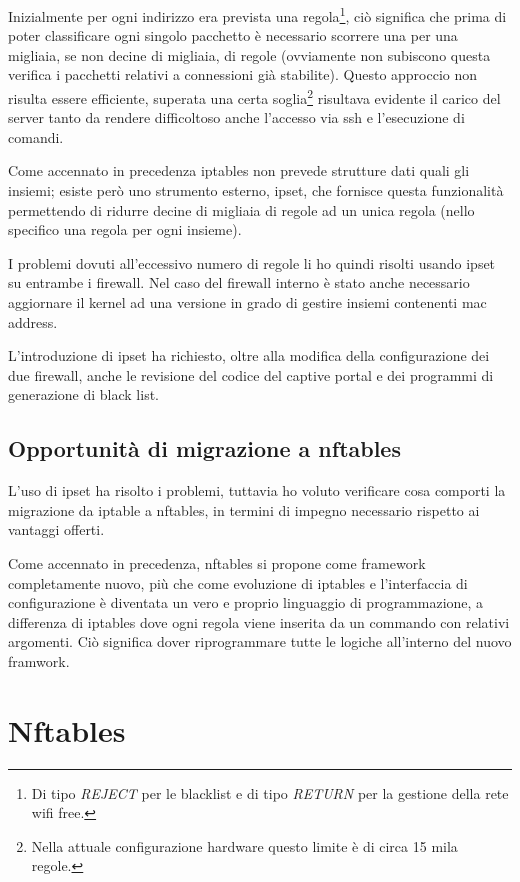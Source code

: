 Inizialmente per ogni indirizzo era prevista una regola\footnote{Di tipo {\em
REJECT} per le blacklist e di tipo {\em RETURN} per la gestione della rete wifi
free.}, ciò significa che prima di poter classificare ogni singolo pacchetto
\`e necessario scorrere una per una migliaia, se non decine di migliaia, di
regole (ovviamente non subiscono questa verifica i pacchetti relativi a
connessioni gi\`a stabilite).  Questo approccio non risulta essere efficiente,
superata una certa soglia\footnote{Nella attuale configurazione hardware
questo limite \`e di circa 15 mila regole.}
risultava evidente il carico del server tanto da rendere difficoltoso anche
l'accesso via ssh e l'esecuzione di comandi.

Come accennato in precedenza iptables non prevede strutture dati quali gli
insiemi; esiste per\`o uno strumento esterno, ipset, che fornisce questa
funzionalità permettendo di ridurre decine di migliaia di regole ad un unica
regola (nello specifico una regola per ogni insieme).

I problemi dovuti all'eccessivo numero di regole li ho quindi risolti usando
ipset su entrambe i firewall.  Nel caso del firewall interno è stato anche
necessario aggiornare il kernel ad una versione in grado di gestire insiemi
contenenti mac address.

L'introduzione di ipset ha richiesto, oltre alla modifica della configurazione
dei due firewall, anche le revisione del codice del captive portal e dei
programmi di generazione di black list.

\section{Opportunità di migrazione a nftables}

L'uso di ipset ha risolto i problemi, tuttavia ho voluto verificare cosa
comporti la migrazione da iptable a nftables, in termini di impegno necessario
rispetto ai vantaggi offerti.

Come accennato in precedenza, nftables si propone come framework completamente
nuovo, più che come evoluzione di iptables  e l'interfaccia di configurazione
è diventata un vero e proprio linguaggio di programmazione, a differenza di
iptables dove ogni regola viene inserita da un commando con relativi
argomenti.  Ci\`o significa dover riprogrammare tutte le logiche all'interno
del nuovo framwork.

\chapter{Nftables}

